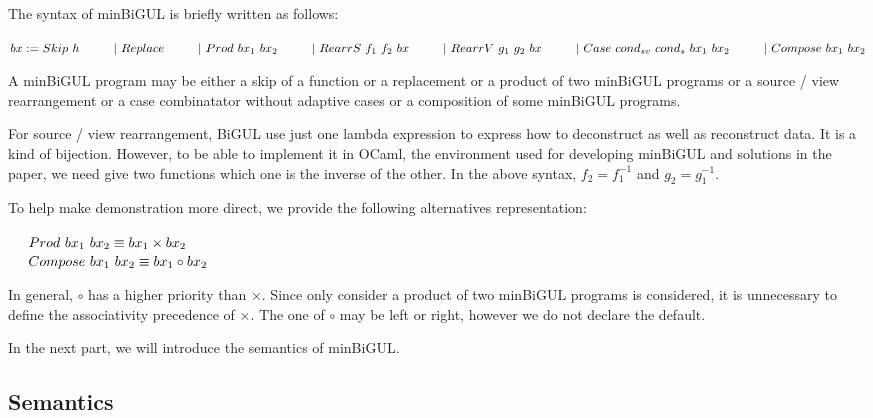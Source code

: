 \documentclass[runningheads]{llncs}
\newcommand{\tab}{\hspace*{5mm}}
\newcommand{\qtab}{\hspace*{5mm} \ \quad}
\begin{document}
The syntax of minBiGUL is briefly written as follows:

$bx := Skip \ h \\ 
    \qtab | \ Replace \\ 
    \qtab | \ Prod \ bx_1 \ bx_2 \\ 
    \qtab | \ RearrS \ f_1 \ f_2 \ bx \\
    \qtab | \ RearrV \ g_1 \ g_2 \ bx \\
    \qtab | \ Case \ cond_{sv} \ cond_{s} \ bx_1 \ bx_2 \\ 
    \qtab | \ Compose \ bx_1 \ bx_2$

A minBiGUL program may be either a skip of a function or a replacement or a product of two minBiGUL programs or a source / view rearrangement or a case combinatator without adaptive cases or a composition of some minBiGUL programs.

For source / view rearrangement, BiGUL use just one lambda expression to express how to deconstruct as well as reconstruct data. It is a kind of bijection. However, to be able to implement it in OCaml, the environment used for developing minBiGUL and solutions in the paper, we need give two functions which one is the inverse of the other. In the above syntax, $f_2 = f_1^{-1}$ and $g_2 = g_1^{-1}$.

To help make demonstration more direct, we provide the following alternatives representation:

    $\tab Prod \ bx_1 \ bx_2 \equiv bx_1 \times bx_2$\\
    $\tab Compose \ bx_1 \ bx_2 \equiv bx_1 \circ bx_2$

In general, $\circ$ has a higher priority than $\times$. Since only consider a product of two minBiGUL programs is considered, it is unnecessary to define the associativity precedence of $\times$. The one of $\circ$ may be left or right, however we do not declare the default.

In the next part, we will introduce the semantics of minBiGUL.

\subsection{Semantics}
\end{document}
